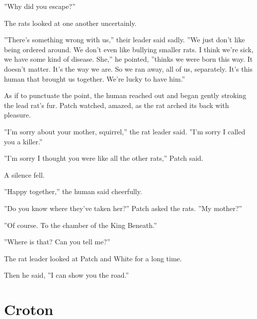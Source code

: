 \documentclass[12pt]{book}
\begin{document}
 ''Why did you escape?''\par
 The rats looked at one another uncertainly.\par
 ''There's something wrong with us,'' their leader said sadly. ''We just don't like being ordered around. We don't even like bullying smaller rats. I think we're sick, we have some kind of disease. She,'' he pointed, ''thinks we were born this way. It doesn't matter. It's the way we are. So we ran away, all of us, separately. It's this human that brought us together. We're lucky to have him.''\par
 As if to punctuate the point, the human reached out and began gently stroking the lead rat's fur. Patch watched, amazed, as the rat arched its back with pleasure.\par
 ''I'm sorry about your mother, squirrel,'' the rat leader said. ''I'm sorry I called you a killer.''\par
 ''I'm sorry I thought you were like all the other rats,'' Patch said.\par
 A silence fell.\par
 ''Happy together,'' the human said cheerfully.\par
 ''Do you know where they've taken her?'' Patch asked the rats. ''My mother?''\par
 ''Of course. To the chamber of the King Beneath.''\par
 ''Where is that? Can you tell me?''\par
 The rat leader looked at Patch and White for a long time.\par
 Then he said, ''I can show you the road.''\par

\section{Croton}
\end{document}
